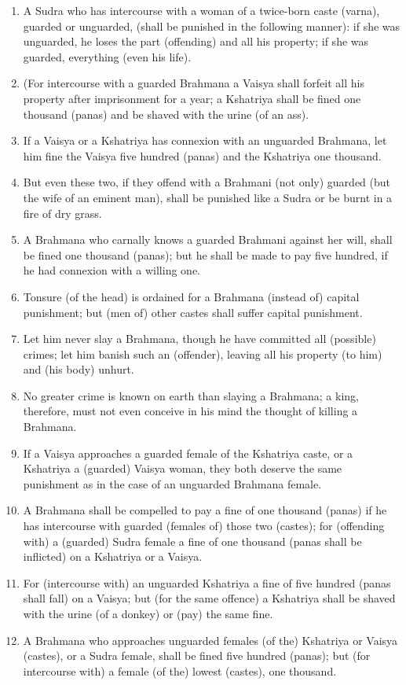 \begin{enumerate}
\item A Sudra who has intercourse with a woman of a twice-born caste (varna), guarded or unguarded, (shall be punished in the following manner): if she was unguarded, he loses the part (offending) and all his property; if she was guarded, everything (even his life).
\item (For intercourse with a guarded Brahmana a Vaisya shall forfeit all his property after imprisonment for a year; a Kshatriya shall be fined one thousand (panas) and be shaved with the urine (of an ass).
\item If a Vaisya or a Kshatriya has connexion with an unguarded Brahmana, let him fine the Vaisya five hundred (panas) and the Kshatriya one thousand.
\item But even these two, if they offend with a Brahmani (not only) guarded (but the wife of an eminent man), shall be punished like a Sudra or be burnt in a fire of dry grass.
\item A Brahmana who carnally knows a guarded Brahmani against her will, shall be fined one thousand (panas); but he shall be made to pay five hundred, if he had connexion with a willing one.
\item Tonsure (of the head) is ordained for a Brahmana (instead of) capital punishment; but (men of) other castes shall suffer capital punishment.
\item Let him never slay a Brahmana, though he have committed all (possible) crimes; let him banish such an (offender), leaving all his property (to him) and (his body) unhurt.
\item No greater crime is known on earth than slaying a Brahmana; a king, therefore, must not even conceive in his mind the thought of killing a Brahmana.
\item If a Vaisya approaches a guarded female of the Kshatriya caste, or a Kshatriya a (guarded) Vaisya woman, they both deserve the same punishment as in the case of an unguarded Brahmana female.
\item A Brahmana shall be compelled to pay a fine of one thousand (panas) if he has intercourse with guarded (females of) those two (castes); for (offending with) a (guarded) Sudra female a fine of one thousand (panas shall be inflicted) on a Kshatriya or a Vaisya.
\item For (intercourse with) an unguarded Kshatriya a fine of five hundred (panas shall fall) on a Vaisya; but (for the same offence) a Kshatriya shall be shaved with the urine (of a donkey) or (pay) the same fine.
\item A Brahmana who approaches unguarded females (of the) Kshatriya or Vaisya (castes), or a Sudra female, shall be fined five hundred (panas); but (for intercourse with) a female (of the) lowest (castes), one thousand.

\end{enumerate}
